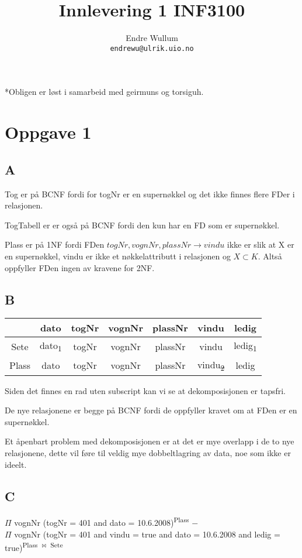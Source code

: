 \documentclass[12pt,norsk,a4paper]{article}
\title{Innlevering 1 INF3100}
\author{Endre Wullum\\ \texttt{endrewu@ulrik.uio.no}}
\begin{document}
\maketitle

*Obligen er løst i samarbeid med geirmuns og torsiguh.

\section*{Oppgave 1}
\subsection*{A}
Tog er på BCNF fordi for togNr er en supernøkkel og det ikke finnes flere FDer i relasjonen.

TogTabell er er også på BCNF fordi den kun har en FD som er supernøkkel.

Plass er på 1NF fordi FDen $togNr, vognNr, plassNr \rightarrow vindu$ ikke er slik at X er en supernøkkel, vindu er ikke et nøkkelattributt i relasjonen og $X \subset K$. Altså oppfyller FDen ingen av kravene for 2NF.

\subsection*{B}
\begin{tabular}{ c | c | c | c | c | c | c}
 & dato & togNr & vognNr & plassNr & vindu & ledig \\
 \hline
Sete & dato\textsubscript{1} & togNr & vognNr & plassNr & vindu & ledig\textsubscript{1}\\
\hline
Plass & dato & togNr & vognNr & plassNr & vindu\textsubscript{\sout{2}} & ledig\\

\end{tabular}

Siden det finnes en rad uten subscript kan vi se at dekomposisjonen er tapsfri.

De nye relasjonene er begge på BCNF fordi de oppfyller kravet om at FDen er en supernøkkel.

 Et åpenbart problem med dekomposisjonen er at det er mye overlapp i de to nye relasjonene, dette vil føre til veldig mye dobbeltlagring av data, noe som ikke er ideelt.

\subsection*{C}
$\Pi$ vognNr (togNr = 401 and dato = 10.6.2008)\textsuperscript{Plass} $-$ \\ $\Pi$ vognNr (togNr = 401 and vindu = true and dato = 10.6.2008 and ledig = true)\textsuperscript{Plass $\Join$  Sete}
\end{document}
